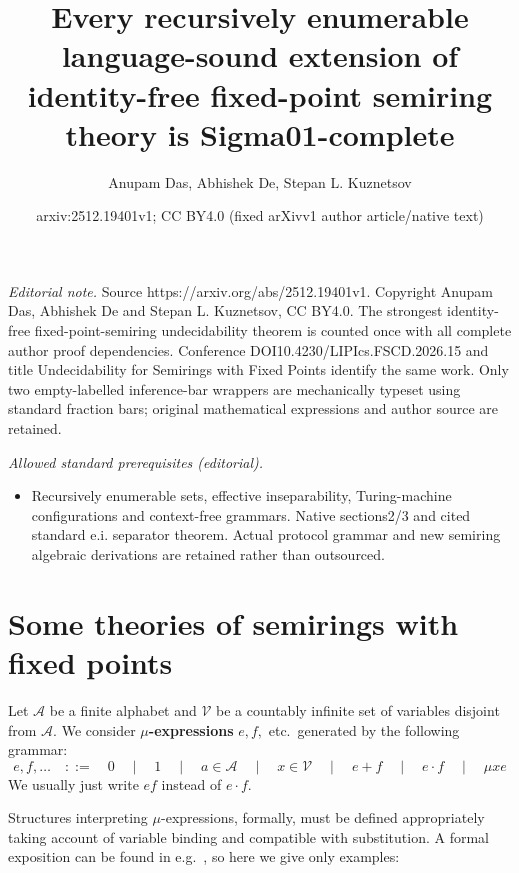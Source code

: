 \documentclass[a4paper,10pt]{amsart}
\title{Every recursively enumerable language-sound extension of identity-free fixed-point semiring theory is Sigma01-complete}
\author{Anupam Das, Abhishek De, Stepan L. Kuznetsov}
\date{arxiv:2512.19401v1; CC BY4.0 (fixed arXivv1 author article/native text)}
\newcommand{\defname}[1]{\textbf{{#1}}}
\theoremstyle{definition}
\newcommand{\Alphabet}{\mathcal{A}}
\newcommand{\Var}{\mathcal{V}}
\begin{document}
\maketitle
\noindent\textit{Editorial note.} Source https://arxiv.org/abs/2512.19401v1. Copyright Anupam Das, Abhishek De and Stepan L. Kuznetsov, CC BY4.0. The strongest identity-free fixed-point-semiring undecidability theorem is counted once with all complete author proof dependencies. Conference DOI10.4230/LIPIcs.FSCD.2026.15 and title Undecidability for Semirings with Fixed Points identify the same work. Only two empty-labelled inference-bar wrappers are mechanically typeset using standard fraction bars; original mathematical expressions and author source are retained.\par\medskip
\noindent\textit{Allowed standard prerequisites (editorial).}\begin{itemize}
\item Recursively enumerable sets, effective inseparability, Turing-machine configurations and context-free grammars. Native sections2/3 and cited standard e.i. separator theorem. Actual protocol grammar and new semiring algebraic derivations are retained rather than outsourced.
\end{itemize}\medskip
\setcounter{section}{1}
\section{Some theories of semirings with fixed points}
\label{sec:prelims}

Let $\Alphabet$ be a finite alphabet and $\Var$ be a countably infinite set of variables disjoint from $\Alphabet$. 
We consider \defname{$\mu$-expressions} $e,f,$ etc.\ generated by the following grammar:
\[
e,f,\dots \quad ::= \quad
0 \quad \mid \quad 1 \quad \mid \quad a \in \Alphabet \quad \mid \quad x\in\Var \quad \mid \quad e+f \quad \mid \quad e\cdot f \quad \mid \quad \mu x e
\]
We usually just write $ef$ instead of $e\cdot f$.

Structures interpreting $\mu$-expressions, formally, must be defined appropriately taking account of variable binding and compatible with substitution. 
A formal exposition can be found in e.g.\ \cite{EsikLeiss05,Leiss16}, so here we give only examples:
\end{document}

